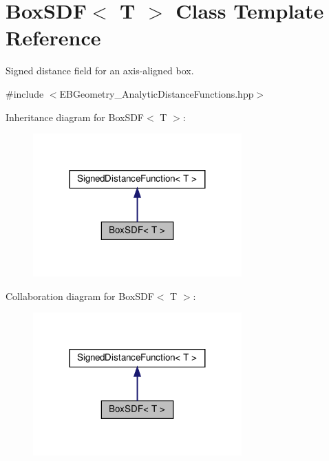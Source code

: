 \hypertarget{classBoxSDF}{}\section{Box\+S\+DF$<$ T $>$ Class Template Reference}
\label{classBoxSDF}


Signed distance field for an axis-\/aligned box.  




{\ttfamily \#include $<$E\+B\+Geometry\+\_\+\+Analytic\+Distance\+Functions.\+hpp$>$}



Inheritance diagram for Box\+S\+DF$<$ T $>$\+:
\nopagebreak
\begin{figure}[H]
\begin{center}
\leavevmode
\includegraphics[width=227pt]{classBoxSDF__inherit__graph}
\end{center}
\end{figure}


Collaboration diagram for Box\+S\+DF$<$ T $>$\+:
\nopagebreak
\begin{figure}[H]
\begin{center}
\leavevmode
\includegraphics[width=227pt]{classBoxSDF__coll__graph}
\end{center}
\end{figure}
